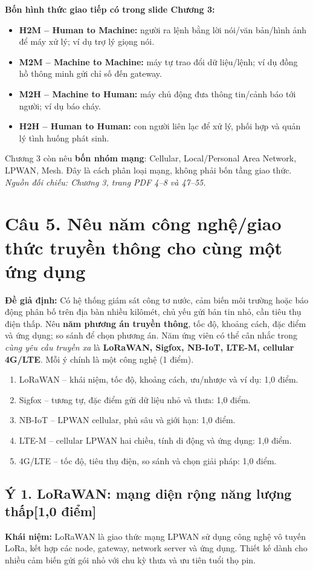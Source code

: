 \documentclass[12pt,a4paper]{article}
\newcommand{\muc}[1]{\subsection*{#1\hfill{\color{teal}\normalsize [1,0 điểm]}}}
\newcommand{\nguon}[1]{{\small\itshape\color{navy}Nguồn đối chiếu: #1.}}
\begin{document}
\textbf{Bốn hình thức giao tiếp có trong slide Chương 3:}
\begin{itemize}
\item \textbf{H2M -- Human to Machine:} người ra lệnh bằng lời nói/văn bản/hình ảnh để máy xử lý; ví dụ trợ lý giọng nói.
\item \textbf{M2M -- Machine to Machine:} máy tự trao đổi dữ liệu/lệnh; ví dụ đồng hồ thông minh gửi chỉ số đến gateway.
\item \textbf{M2H -- Machine to Human:} máy chủ động đưa thông tin/cảnh báo tới người; ví dụ báo cháy.
\item \textbf{H2H -- Human to Human:} con người liên lạc để xử lý, phối hợp và quản lý tình huống phát sinh.
\end{itemize}
Chương 3 còn nêu \textbf{bốn nhóm mạng}: Cellular, Local/Personal Area Network, LPWAN, Mesh. Đây là cách phân loại mạng, không phải bốn tầng giao thức. \nguon{Chương 3, trang PDF 4--8 và 47--55}

\newpage
\section{Câu 5. Nêu năm công nghệ/giao thức truyền thông cho cùng một ứng dụng}
\textbf{Đề giả định:} Có hệ thống giám sát công tơ nước, cảm biến môi trường hoặc báo động phân bố trên địa bàn nhiều kilômét, chủ yếu gửi bản tin nhỏ, cần tiêu thụ điện thấp. Nêu \textbf{năm phương án truyền thông}, tốc độ, khoảng cách, đặc điểm và ứng dụng; so sánh để chọn phương án. Năm ứng viên có thể cân nhắc trong \emph{cùng yêu cầu truyền xa} là \textbf{LoRaWAN, Sigfox, NB-IoT, LTE-M, cellular 4G/LTE}. Mỗi ý chính là một công nghệ (1 điểm).

\begin{barem}
\begin{enumerate}
\item LoRaWAN -- khái niệm, tốc độ, khoảng cách, ưu/nhược và ví dụ: 1,0 điểm.
\item Sigfox -- tương tự, đặc điểm gửi dữ liệu nhỏ và thưa: 1,0 điểm.
\item NB-IoT -- LPWAN cellular, phủ sâu và giới hạn: 1,0 điểm.
\item LTE-M -- cellular LPWAN hai chiều, tính di động và ứng dụng: 1,0 điểm.
\item 4G/LTE -- tốc độ, tiêu thụ điện, so sánh và chọn giải pháp: 1,0 điểm.
\end{enumerate}
\end{barem}

\muc{Ý 1. LoRaWAN: mạng diện rộng năng lượng thấp}
\textbf{Khái niệm:} LoRaWAN là giao thức mạng LPWAN sử dụng công nghệ vô tuyến LoRa, kết hợp các node, gateway, network server và ứng dụng. Thiết kế dành cho nhiều cảm biến gửi gói nhỏ với chu kỳ thưa và ưu tiên tuổi thọ pin.
\end{document}
